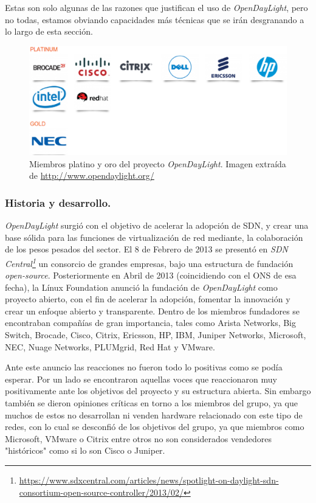 \documentclass[a4paper,11pt]{book}
\begin{document}
Estas son solo algunas de las razones que justifican el uso de \emph{OpenDayLight}, pero no todas, estamos obviando capacidades más técnicas que se irán desgranando a lo largo de esta sección.

\begin{figure}[tb]
\centering
\includegraphics[scale=0.5]{./figuras/ODLMembers}
\caption[\emph{OpenDayLight} Platinum Members]{Miembros platino y oro del proyecto \emph{OpenDayLight}. Imagen extraída de \url{http://www.opendaylight.org/}}\label{ODLMembers}
\end{figure}

\subsubsection{Historia y desarrollo.}
\emph{OpenDayLight} surgió con el objetivo de acelerar la adopción de \ac{SDN}, y crear una base sólida para las funciones de virtualización de red mediante, la colaboración de los pesos pesados del sector. El 8 de Febrero de 2013 se presentó en \textit{SDN Central\footnote{\url{https://www.sdxcentral.com/articles/news/spotlight-on-daylight-sdn-consortium-open-source-controller/2013/02/}}} un consorcio de grandes empresas, bajo una estructura de fundación \textit{open-source}. Posteriormente en Abril de 2013 (coincidiendo con el \ac{ONS} de esa fecha), la Línux Foundation anunció la fundación de \emph{OpenDayLight} como proyecto abierto, con el fin de acelerar la adopción, fomentar la innovación y crear un enfoque abierto y transparente. Dentro de los miembros fundadores se encontraban compañías de gran importancia, tales como Arista Networks, Big Switch, Brocade, Cisco, Citrix, Ericsson, HP, IBM, Juniper Networks, Microsoft, NEC, Nuage Networks, PLUMgrid, Red Hat y VMware. 

Ante este anuncio las reacciones no fueron todo lo positivas como se podía esperar. Por un lado se encontraron aquellas voces que reaccionaron muy positivamente ante los objetivos del proyecto y su estructura abierta. Sin embargo también se dieron opiniones críticas en torno a los miembros del grupo, ya que muchos de estos no desarrollan ni venden hardware relacionado con este tipo de redes, con lo cual se desconfió de los objetivos del grupo, ya que miembros como Microsoft, VMware o Citrix entre otros no son considerados vendedores "históricos" como si lo son Cisco o Juniper.
\end{document}
